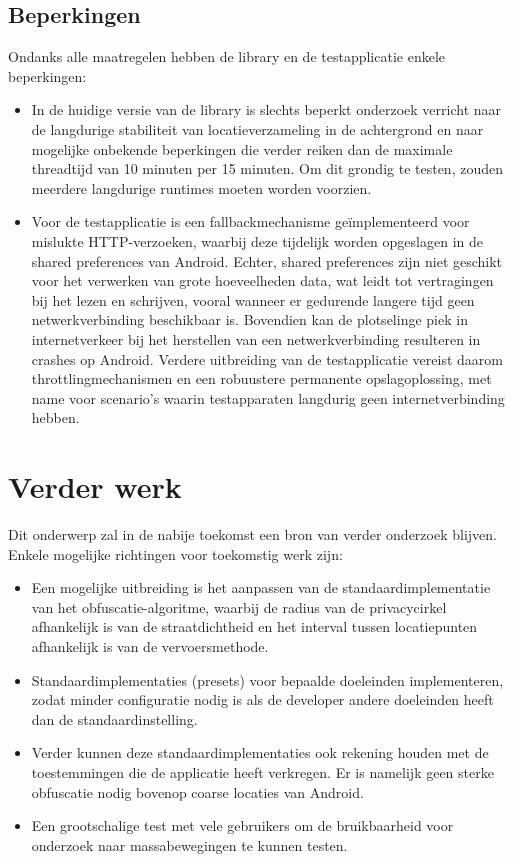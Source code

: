 \subsection{Beperkingen}
Ondanks alle maatregelen hebben de library en de testapplicatie enkele beperkingen:
\begin{itemize}
    \item In de huidige versie van de library is slechts beperkt onderzoek verricht naar de langdurige stabiliteit van locatieverzameling in de achtergrond en naar mogelijke onbekende beperkingen die verder reiken dan de maximale threadtijd van 10 minuten per 15 minuten. Om dit grondig te testen, zouden meerdere langdurige runtimes moeten worden voorzien.
    \item Voor de testapplicatie is een fallbackmechanisme geïmplementeerd voor mislukte HTTP-verzoeken, waarbij deze tijdelijk worden opgeslagen in de shared preferences van Android. Echter, shared preferences zijn niet geschikt voor het verwerken van grote hoeveelheden data, wat leidt tot vertragingen bij het lezen en schrijven, vooral wanneer er gedurende langere tijd geen netwerkverbinding beschikbaar is. Bovendien kan de plotselinge piek in internetverkeer bij het herstellen van een netwerkverbinding resulteren in crashes op Android. Verdere uitbreiding van de testapplicatie vereist daarom throttlingmechanismen en een robuustere permanente opslagoplossing, met name voor scenario's waarin testapparaten langdurig geen internetverbinding hebben.
\end{itemize}

\section{Verder werk}
Dit onderwerp zal in de nabije toekomst een bron van verder onderzoek blijven. Enkele mogelijke richtingen voor toekomstig werk zijn:
\begin{itemize}
    \item Een mogelijke uitbreiding is het aanpassen van de standaardimplementatie van het obfuscatie-algoritme, waarbij de radius van de privacycirkel afhankelijk is van de straatdichtheid en het interval tussen locatiepunten afhankelijk is van de vervoersmethode.
    \item Standaardimplementaties (presets) voor bepaalde doeleinden implementeren, zodat minder configuratie nodig is als de developer andere doeleinden heeft dan de standaardinstelling.
    \item Verder kunnen deze standaardimplementaties ook rekening houden met de toestemmingen die de applicatie heeft verkregen. Er is namelijk geen sterke obfuscatie nodig bovenop coarse locaties van Android.
    \item Een grootschalige test met vele gebruikers om de bruikbaarheid voor onderzoek naar massabewegingen te kunnen testen.
\end{itemize}

